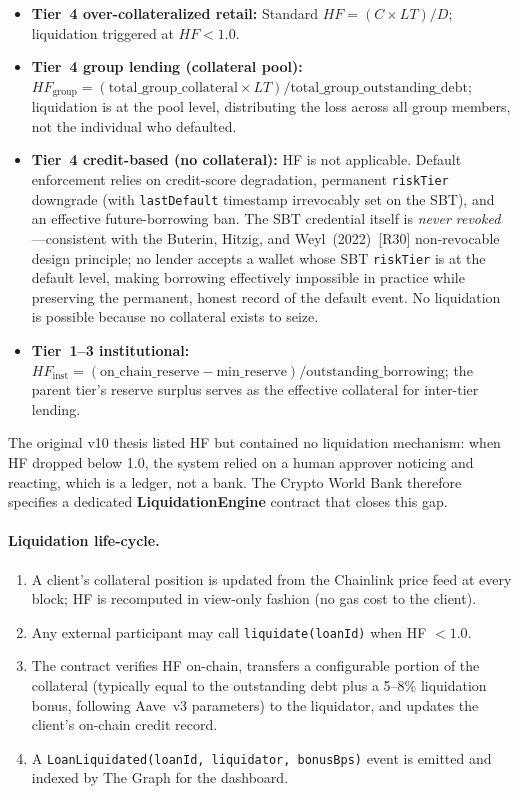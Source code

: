 \documentclass[12pt,a4paper]{report}
\begin{document}
\begin{itemize}[noitemsep]
\item \textbf{Tier~4 over-collateralized retail:} Standard $HF = (C \times LT) / D$; liquidation triggered at $HF < 1.0$.
\item \textbf{Tier~4 group lending (collateral pool):} $HF_{\text{group}} = (\text{total\_group\_collateral} \times LT) / \text{total\_group\_outstanding\_debt}$; liquidation is at the pool level, distributing the loss across all group members, not the individual who defaulted.
\item \textbf{Tier~4 credit-based (no collateral):} HF is not applicable. Default enforcement relies on credit-score degradation, permanent \texttt{riskTier} downgrade (with \texttt{lastDefault} timestamp irrevocably set on the SBT), and an effective future-borrowing ban. The SBT credential itself is \textit{never revoked}---consistent with the Buterin, Hitzig, and Weyl~(2022)~[R30] non-revocable design principle; no lender accepts a wallet whose SBT \texttt{riskTier} is at the default level, making borrowing effectively impossible in practice while preserving the permanent, honest record of the default event. No liquidation is possible because no collateral exists to seize.
\item \textbf{Tier~1--3 institutional:} $HF_{\text{inst}} = (\text{on\_chain\_reserve} - \text{min\_reserve}) / \text{outstanding\_borrowing}$; the parent tier's reserve surplus serves as the effective collateral for inter-tier lending.
\end{itemize}

The original v10 thesis listed HF but contained no liquidation mechanism: when HF dropped below 1.0, the system relied on a human approver noticing and reacting, which is a ledger, not a bank. The Crypto World Bank therefore specifies a dedicated \textbf{LiquidationEngine} contract that closes this gap.

\paragraph{Liquidation life-cycle.}
\begin{enumerate}[noitemsep]
\item A client's collateral position is updated from the Chainlink price feed at every block; HF is recomputed in view-only fashion (no gas cost to the client).
\item Any external participant may call \texttt{liquidate(loanId)} when HF $< 1.0$.
\item The contract verifies HF on-chain, transfers a configurable portion of the collateral (typically equal to the outstanding debt plus a 5--8\% liquidation bonus, following Aave~v3 parameters) to the liquidator, and updates the client's on-chain credit record.
\item A \texttt{LoanLiquidated(loanId, liquidator, bonusBps)} event is emitted and indexed by The Graph for the dashboard.
\end{enumerate}
\end{document}
